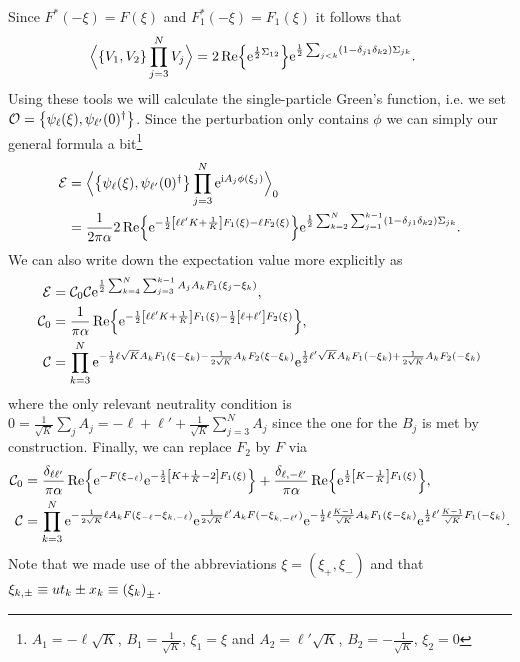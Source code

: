 \documentclass[english, parskip=full]{scrartcl}
\begin{document}
Since $F^\ast(-\xi)=F(\xi)$ and $F_1^\ast(-\xi) = F_1(\xi)$ it follows that
\begin{align}
\bra[\Big]{\klc*{V_1, V_2} \prod_{j=3}^NV_j} &= 2\Re \klc*{\powe{\frac{1}{2} \Sigma_{12}}} \powe{\frac{1}{2} \sum_{j<k} \kla*{1 - \delta_{j1} \delta_{k2}} \Sigma_{jk}}.
\end{align}
Using these tools we will calculate the single-particle Green's function, i.e. we set $\mathcal{O} = \klc*{\psi_\ell(\xi), \psi_{\ell'}(0)^\dagger}$.
Since the perturbation only contains $\phi$ we can simply our general formula a bit\footnote{$A_{1} = -\ell \sqrt{K}$, $B_{1} = \frac{1}{\sqrt{K}}$, $\xi_{1} = \xi$ and $A_{2} = \ell' \sqrt{K}$, $B_{2} = -\frac{1}{\sqrt{K}}$, $\xi_{2} = 0$}
\begin{align}
\mathcal{E} &= \bra[\Big]{\klc*{\psi_\ell(\xi), \psi_{\ell'}(0)^\dagger} \prod_{j=3}^N \powe{\i A_j\phi(\xi_j)} }_0 \\
&= \frac{1}{2\pi\alpha} 2\Re \klc*{\powe{-\frac{1}{2} \klb*{\ell\ell' K + \frac{1}{K}}F_1(\xi) - \ell F_2(\xi)}} \powe{\frac{1}{2} \sum_{k=2}^{N} \sum_{j=1}^{k-1} \kla*{1 - \delta_{j1} \delta_{k2}} \Sigma_{jk}}.
\end{align}
We can also write down the expectation value more explicitly as
\begin{align}
\mathcal{E} &= \mathcal{C}_0 \mathcal{C} \powe{\frac{1}{2} \sum_{k=4}^N \sum_{j=3}^{k-1} A_jA_kF_1(\xi_j-\xi_k)},\\
\mathcal{C}_0 &= \frac{1}{\pi\alpha} \Re \klc*{\powe{-\frac{1}{2} \klb*{\ell\ell' K + \frac{1}{K}}F_1(\xi) - \frac{1}{2} \klb*{\ell + \ell'} F_2(\xi)}},\\
\mathcal{C} &= \prod_{k=3}^N \powe{-\frac{1}{2} \ell \sqrt{K} A_k F_1(\xi - \xi_k) - \frac{1}{2\sqrt{K}} A_k F_2(\xi - \xi_k)} \powe{\frac{1}{2} \ell' \sqrt{K} A_k F_1(-\xi_k) + \frac{1}{2\sqrt{K}} A_k F_2(-\xi_k)}
\end{align}
where the only relevant neutrality condition is $0=\frac{1}{\sqrt{K}}\sum_jA_j = -\ell + \ell' + \frac{1}{\sqrt{K}} \sum_{j=3}^N A_j$ since the one for the $B_j$ is met by construction.
Finally, we can replace $F_2$ by $F$ via
\begin{align}
\mathcal{C}_0 &= \frac{\delta_{\ell\ell'}}{\pi\alpha} \Re\klc*{\powe{- F(\xi_{-\ell})} \powe{-\frac{1}{2} \klb*{K + \frac{1}{K} - 2}F_1(\xi)}} + \frac{\delta_{\ell,-\ell'}}{\pi\alpha} \Re\klc*{\powe{\frac{1}{2} \klb*{K - \frac{1}{K}} F_1(\xi)}},\\
\mathcal{C} &= \prod_{k=3}^N \powe{-\frac{1}{2\sqrt{K}} \ell A_k F\kla{\xi_{-\ell} - \xi_{k,-\ell}}} \powe{\frac{1}{2\sqrt{K}} \ell'A_k F\kla{-\xi_{k,-\ell'}}} \powe{-\frac{1}{2} \ell \frac{K-1}{\sqrt{K}} A_k F_1(\xi - \xi_k)} \powe{\frac{1}{2} \ell' \frac{K-1}{\sqrt{K}} F_1(-\xi_k)}.
\end{align}
Note that we made use of the abbreviations $\xi = (\xi_+,\xi_-)$ and that $\xi_{k,\pm} \equiv ut_k \pm x_k \equiv \kla*{\xi_k}_\pm$.
\end{document}
